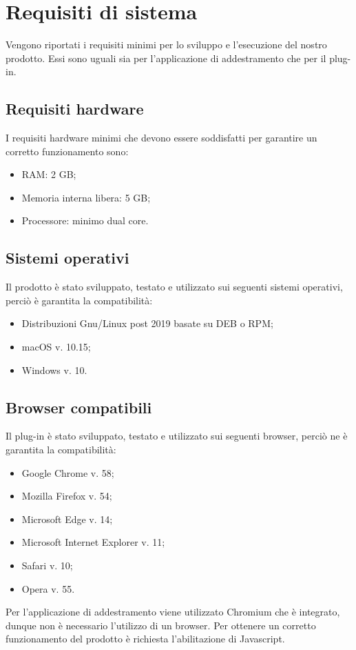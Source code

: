 \section{Requisiti di sistema}
Vengono riportati i requisiti minimi per lo sviluppo e l'esecuzione del nostro prodotto. Essi sono uguali sia per l'applicazione di addestramento che per il plug-in.

\subsection{Requisiti hardware}
I requisiti hardware minimi che devono essere soddisfatti per garantire un corretto funzionamento sono:
\begin{itemize}
	\item RAM: 2 GB;
	\item Memoria interna libera: 5 GB;
	\item Processore: minimo dual core.
\end{itemize}

\subsection{Sistemi operativi}
Il prodotto è stato sviluppato, testato e utilizzato sui seguenti sistemi operativi, perciò è garantita la compatibilità:
\begin{itemize}
	\item Distribuzioni Gnu/Linux post 2019 basate su DEB o RPM;
	\item macOS v. 10.15;
	\item Windows v. 10.
\end{itemize}

\subsection{Browser compatibili}
Il plug-in è stato sviluppato, testato e utilizzato sui seguenti browser, perciò ne è garantita la compatibilità:
\begin{itemize}
	\item Google Chrome v. 58;
	\item Mozilla Firefox v. 54;
	\item Microsoft Edge v. 14;
	\item Microsoft Internet Explorer v. 11;
	\item Safari v. 10;
	\item Opera v. 55.
\end{itemize}
Per l'applicazione di addestramento viene utilizzato Chromium che è integrato, dunque non è necessario l'utilizzo di un browser.
Per ottenere un corretto funzionamento del prodotto è richiesta l'abilitazione di Javascript.
